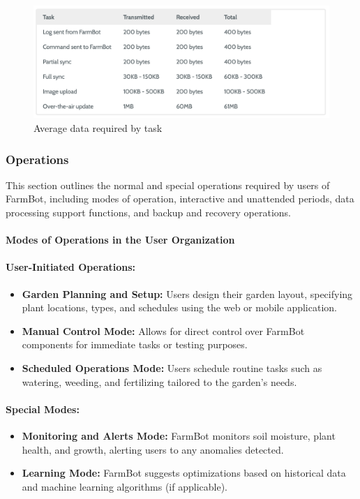 \begin{figure}[H]
    \centering
\includegraphics[scale=0.3]{./Figures/farmbot_data_required.png}
\caption{Average data required by task}
\end{figure}

\subsubsection{Operations}

This section outlines the normal and special operations required by users of FarmBot, including modes of operation, interactive and unattended periods, data processing support functions, and backup and recovery operations.

\paragraph{Modes of Operations in the User Organization}

\paragraph{User-Initiated Operations:}
\begin{itemize}
    \item \textbf{Garden Planning and Setup:} Users design their garden layout, specifying plant locations, types, and schedules using the web or mobile application.
    \item \textbf{Manual Control Mode:} Allows for direct control over FarmBot components for immediate tasks or testing purposes.
    \item \textbf{Scheduled Operations Mode:} Users schedule routine tasks such as watering, weeding, and fertilizing tailored to the garden’s needs.
\end{itemize}

\paragraph{Special Modes:}
\begin{itemize}
    \item \textbf{Monitoring and Alerts Mode:} FarmBot monitors soil moisture, plant health, and growth, alerting users to any anomalies detected.
    \item \textbf{Learning Mode:} FarmBot suggests optimizations based on historical data and machine learning algorithms (if applicable).
\end{itemize}

